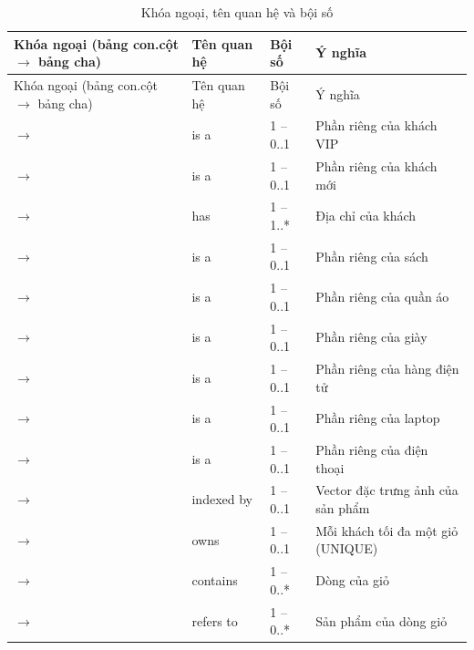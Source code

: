 \documentclass[12pt,a4paper]{article}
\begin{document}
\begin{longtable}{@{}P{4.9cm}P{2.4cm}P{1.6cm}P{6.6cm}@{}}
\caption{Khóa ngoại, tên quan hệ và bội số}\label{tab:fks}\\
\toprule
Khóa ngoại (bảng con.cột $\to$ bảng cha) & Tên quan hệ & Bội số & Ý nghĩa\\
\midrule
\endfirsthead
\toprule
Khóa ngoại (bảng con.cột $\to$ bảng cha) & Tên quan hệ & Bội số & Ý nghĩa\\
\midrule
\endhead
\small{} $\to$  & \small is a & \small 1 -- 0..1 & \small Phần riêng của khách VIP\\
\small{} $\to$  & \small is a & \small 1 -- 0..1 & \small Phần riêng của khách mới\\
\small{} $\to$  & \small has & \small 1 -- 1..* & \small Địa chỉ của khách\\
\small{} $\to$  & \small is a & \small 1 -- 0..1 & \small Phần riêng của sách\\
\small{} $\to$  & \small is a & \small 1 -- 0..1 & \small Phần riêng của quần áo\\
\small{} $\to$  & \small is a & \small 1 -- 0..1 & \small Phần riêng của giày\\
\small{} $\to$  & \small is a & \small 1 -- 0..1 & \small Phần riêng của hàng điện tử\\
\small{} $\to$  & \small is a & \small 1 -- 0..1 & \small Phần riêng của laptop\\
\small{} $\to$  & \small is a & \small 1 -- 0..1 & \small Phần riêng của điện thoại\\
\small{} $\to$  & \small indexed by & \small 1 -- 0..1 & \small Vector đặc trưng ảnh của sản phẩm\\
\small{} $\to$  & \small owns & \small 1 -- 0..1 & \small Mỗi khách tối đa một giỏ (UNIQUE)\\
\small{} $\to$  & \small contains & \small 1 -- 0..* & \small Dòng của giỏ\\
\small{} $\to$  & \small refers to & \small 1 -- 0..* & \small Sản phẩm của dòng giỏ\\

\end{longtable}
\end{document}
